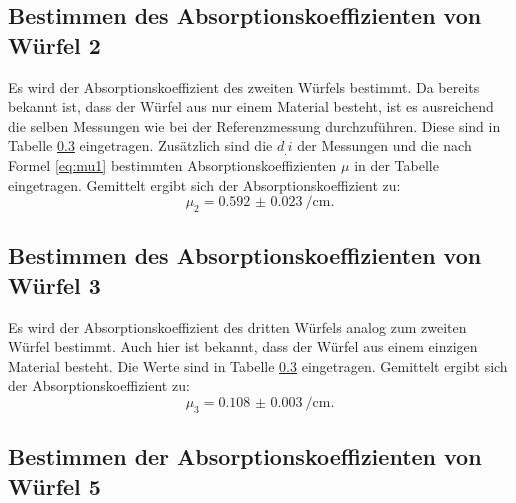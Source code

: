 \subsection{Bestimmen des Absorptionskoeffizienten von Würfel 2}

Es wird der Absorptionskoeffizient des zweiten Würfels bestimmt. Da bereits bekannt ist, dass der Würfel aus nur einem Material besteht, ist es ausreichend die selben Messungen wie bei der Referenzmessung durchzuführen. Diese sind in Tabelle \ref{} eingetragen. Zusätzlich sind die $d_.i$ der Messungen und die nach Formel \ref{eq:mu1} bestimmten Absorptionskoeffizienten $\mu$ in der Tabelle eingetragen.
Gemittelt ergibt sich der Absorptionskoeffizient zu:
\[
\mu_2 = \SI{0.592(23)}{\per\centi\metre}\text{.}
\]

\subsection{Bestimmen des Absorptionskoeffizienten von Würfel 3}

Es wird der Absorptionskoeffizient des dritten Würfels analog zum zweiten Würfel bestimmt. Auch hier ist bekannt, dass der Würfel aus einem einzigen Material besteht. Die Werte sind in Tabelle \ref{} eingetragen.
Gemittelt ergibt sich der Absorptionskoeffizient zu:
\[
\mu_3 = \SI{0.108(3)}{\per\centi\metre}\text{.}
\]

\subsection{Bestimmen der Absorptionskoeffizienten von Würfel 5}

